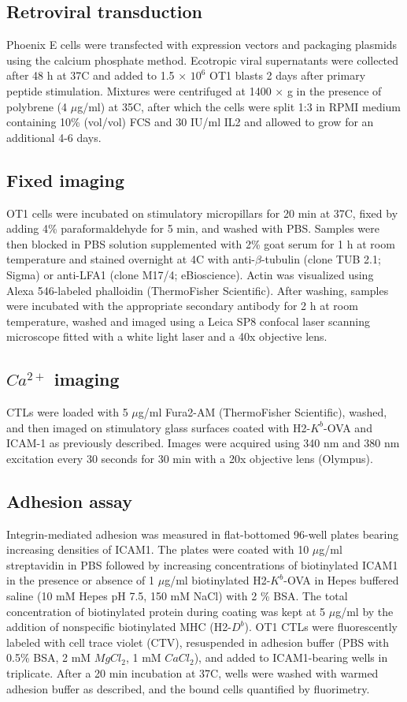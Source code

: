\subsection{Retroviral transduction}
Phoenix E cells were transfected with expression vectors and packaging plasmids using the calcium phosphate method. Ecotropic viral supernatants were collected after 48 h at 37\degree C and added to 1.5 × $10^{6}$ OT1 blasts 2 days after primary peptide stimulation. Mixtures were centrifuged at 1400 × g in the presence of polybrene (4 $\mu$g/ml) at 35\degree C, after which the cells were split 1:3 in RPMI medium containing 10\% (vol/vol) FCS and 30 IU/ml IL2 and allowed to grow for an additional 4-6 days.

\subsection{Fixed imaging}
OT1 cells were incubated on stimulatory micropillars for 20 min at 37\degree C, fixed by adding 4\% paraformaldehyde for 5 min, and washed with PBS. Samples were then blocked in PBS solution supplemented with 2\% goat serum for 1 h at room temperature and stained overnight at 4\degree C with anti-$\beta$-tubulin (clone TUB 2.1; Sigma) or anti-LFA1 (clone M17/4; eBioscience). Actin was visualized using Alexa 546-labeled phalloidin (ThermoFisher Scientific). After washing, samples were incubated with the appropriate secondary antibody for 2 h at room temperature, washed and imaged using a Leica SP8 confocal laser scanning microscope fitted with a white light laser and a 40x objective lens.

\subsection{$Ca^{2+}$ imaging}
CTLs were loaded with 5 $\mu$g/ml Fura2-AM (ThermoFisher Scientific), washed, and then imaged on stimulatory glass surfaces coated with H2-$K^{b}$-OVA and ICAM-1 as previously described. Images were acquired using 340 nm and 380 nm excitation every 30 seconds for 30 min with a 20x objective lens (Olympus).

\subsection{Adhesion assay}
Integrin-mediated adhesion was measured in flat-bottomed 96-well plates bearing increasing densities of ICAM1. The plates were coated with 10 $\mu$g/ml streptavidin in PBS followed by increasing concentrations of biotinylated ICAM1 in the presence or absence of 1 $\mu$g/ml biotinylated H2-$K^{b}$-OVA in Hepes buffered saline (10 mM Hepes pH 7.5, 150 mM NaCl) with 2 \% BSA. The total concentration of biotinylated protein during coating was kept at 5 $\mu$g/ml by the addition of nonspecific biotinylated MHC (H2-$D^{b}$). OT1 CTLs were fluorescently labeled with cell trace violet (CTV), resuspended in adhesion buffer (PBS with 0.5\% BSA, 2 mM $MgCl_2$, 1 mM $CaCl_2$), and added to ICAM1-bearing wells in triplicate. After a 20 min incubation at 37\degree C, wells were washed with warmed adhesion buffer as described, and the bound cells quantified by fluorimetry.

